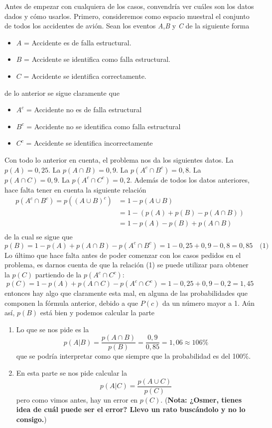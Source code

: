 \documentclass[11pt]{article}
\renewcommand{\(}{\left(}
\renewcommand{\)}{\right)}
\begin{document}
Antes de empezar con cualquiera de los casos, convendría ver cuáles son los datos dados y cómo usarlos. Primero, consideremos como espacio muestral el conjunto de todos los accidentes de avión. Sean los eventos \textit{A},\textit{B} y \textit{C} de la siguiente forma
\begin{itemize}
	\item $A$ = Accidente es de falla estructural.
	\item $B$ = Accidente se identifica como falla estructural.
	\item $C$ = Accidente se identifica correctamente.
\end{itemize}
de lo anterior se sigue claramente que
\begin{itemize}
	\item $A^c$ = Accidente no es de falla estructural
	\item $B^c$ = Accidente no se identifica como falla estructural
	\item $C^c$ = Accidente se identifica incorrectamente
\end{itemize}
Con todo lo anterior en cuenta, el problema nos da los siguientes datos. La $p(A) = 0,25$. La $p(A \cap B) = 0,9$. La $p(A^c \cap B^c) = 0,8$. La $p(A \cap C) = 0,9$. La $p(A^c \cap C^c) = 0,2$. Además de todos los datos anteriores, hace falta tener en cuenta la siguiente relación
\begin{align*} 
p(A^c \cap B^c) = p((A \cup B)^c) &= 1 - p(A \cup B) \\
								  &= 1 - (p(A) + p(B) - p(A \cap B)) \\
								  &= 1 - p(A) - p(B) + p(A \cap B) \\
\end{align*}
de la cual se sigue que 
$$ p(B) = 1 - p(A) + p(A \cap B) - p(A^c \cap B^c) = 1 - 0,25 + 0,9 - 0,8 = 0,85 \quad \text{(1)}$$
Lo último que hace falta antes de poder comenzar con los casos pedidos en el problema, es darnos cuenta de que la relación (1) se puede utilizar para obtener la $p(C)$ partiendo de la $p(A^c \cap C^c)$:
$$ p(C) = 1 - p(A) + p(A \cap C) - p(A^c \cap C^c) = 1 - 0,25 + 0,9 - 0,2 = 1,45 $$
entonces hay algo que claramente esta mal, en alguna de las probabilidades que componen la fórmula anterior, debido a que $P(c)$ da un número mayor a 1. Aún así, $p(B)$ está bien y podemos calcular la parte

\begin{enumerate}
	\item Lo que se nos pide es la 
	$$p(A|B) = \frac{p(A \cap B)}{p(B)} = \frac{0,9}{0,85} = 1,06 \approx 106\%$$
	que se podría interpretar como que siempre que la probabilidad es del 100\%.
	\item En esta parte se nos pide calcular la 
	$$p(A|C) = \frac{p(A \cup C)}{p(C)} $$
	pero como vimos antes, hay un error en $p(C)$. (\textbf{Nota: ¿Osmer, tienes idea de cuál puede ser el error? Llevo un rato buscándolo y no lo consigo.}) 
\end{enumerate}
\end{document}

